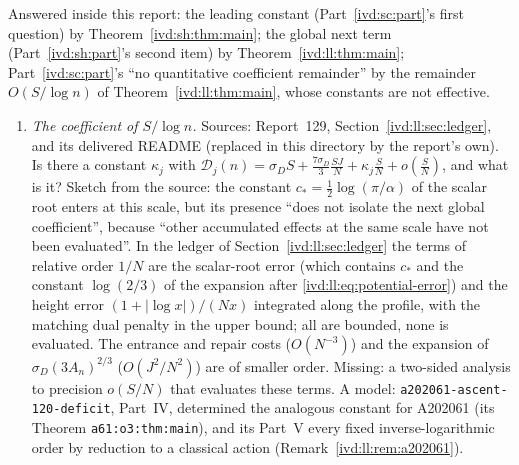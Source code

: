 \documentclass[11pt,letterpaper]{article}
\theoremstyle{remark}\newtheorem{remark}[theorem]{Remark}
\numberwithin{equation}{section}
\newcommand{\file}[1]{\nolinkurl{#1}}
\newcommand{\Dfc}{\mathcal D}
\begin{document}
Answered inside this report: the leading constant (Part~\ref{ivd:sc:part}'s first question) by Theorem~\ref{ivd:sh:thm:main}; the global next term (Part~\ref{ivd:sh:part}'s second item) by Theorem~\ref{ivd:ll:thm:main}; Part~\ref{ivd:sc:part}'s ``no quantitative coefficient remainder'' by the remainder $O(S/\log n)$ of Theorem~\ref{ivd:ll:thm:main}, whose constants are not effective.
\begin{enumerate}
\item \emph{The coefficient of $S/\log n$.} Sources: Report~129, Section~\ref{ivd:ll:sec:ledger}, and its delivered README (replaced in this directory by the report's own). Is there a constant $\kappa_j$ with $\Dfc_j(n)=\sigma_DS+\frac{7\sigma_D}3\frac{SJ}N+\kappa_j\frac SN+o(\frac SN)$, and what is it? Sketch from the source: the constant $c_*=\frac12\log(\pi/\alpha)$ of the scalar root enters at this scale, but its presence ``does not isolate the next global coefficient'', because ``other accumulated effects at the same scale have not been evaluated''. In the ledger of Section~\ref{ivd:ll:sec:ledger} the terms of relative order $1/N$ are the scalar-root error (which contains $c_*$ and the constant $\log(2/3)$ of the expansion after \eqref{ivd:ll:eq:potential-error}) and the height error $(1+|\log x|)/(Nx)$ integrated along the profile, with the matching dual penalty in the upper bound; all are bounded, none is evaluated. The entrance and repair costs ($O(N^{-3})$) and the expansion of $\sigma_D(3A_n)^{2/3}$ ($O(J^2/N^2)$) are of smaller order. Missing: a two-sided analysis to precision $o(S/N)$ that evaluates these terms. A model: \file{a202061-ascent-120-deficit}, Part~IV, determined the analogous constant for A202061 (its Theorem \texttt{a61:o3:thm:main}), and its Part~V every fixed inverse-logarithmic order by reduction to a classical action (Remark~\ref{ivd:ll:rem:a202061}).


\end{enumerate}
\end{document}
